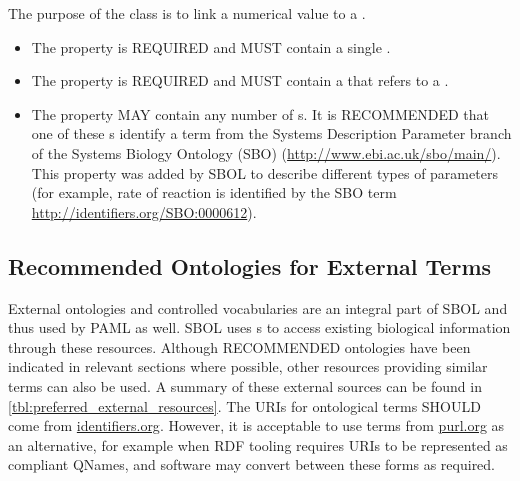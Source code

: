 The purpose of the  class is to link a numerical value to a . 

\begin{itemize}
\item \label{sec:om:hasNumericalValue}
The  property is REQUIRED and MUST contain a single .

\item \label{sec:om:hasUnit:Measure}
The  property is REQUIRED and MUST contain a  that refers to a . 

\item \label{sec:sbol:type:Measure}
The  property MAY contain any number of s. It is RECOMMENDED that one of these s identify a term from the Systems Description Parameter branch of the Systems Biology Ontology (SBO) (\url{http://www.ebi.ac.uk/sbo/main/}). This  property was added by SBOL to describe different types of parameters 
(for example, rate of reaction is identified by the SBO term \url{http://identifiers.org/SBO:0000612}).
\end{itemize}

\subsection{Recommended Ontologies for External Terms}
\label{sec:recomm_ontologies}

External ontologies and controlled vocabularies are an integral part of SBOL and thus used by PAML as well. SBOL uses s to access existing biological information through these resources. 
Although RECOMMENDED ontologies have been indicated in relevant sections where possible, other resources providing similar terms can also be used. A summary of these external sources can be found in \ref{tbl:preferred_external_resources}.
The URIs for ontological terms SHOULD come from \url{identifiers.org}.  However, it is acceptable to use terms from \url{purl.org} as an alternative, for example when RDF tooling requires URIs to be represented as compliant QNames, and software may convert between these forms as required.

